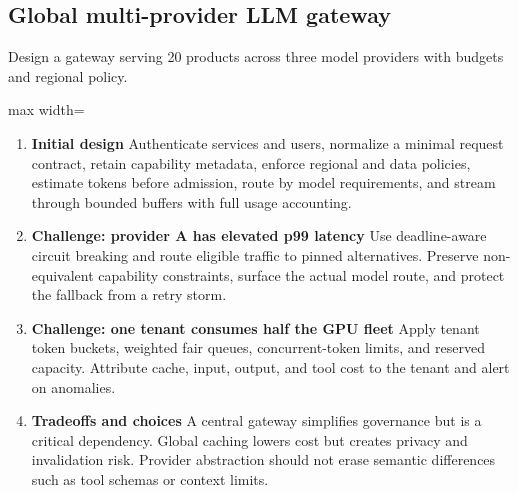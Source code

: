 \subsection{Global multi-provider LLM gateway}
Design a gateway serving 20 products across three model providers with budgets and regional policy.
\begin{center}\begin{adjustbox}{max width=\linewidth}\end{adjustbox}\end{center}
\begin{enumerate}
\item \textbf{Initial design} Authenticate services and users, normalize a minimal request contract, retain capability metadata, enforce regional and data policies, estimate tokens before admission, route by model requirements, and stream through bounded buffers with full usage accounting.
\item \textbf{Challenge: provider A has elevated p99 latency} Use deadline-aware circuit breaking and route eligible traffic to pinned alternatives. Preserve non-equivalent capability constraints, surface the actual model route, and protect the fallback from a retry storm.
\item \textbf{Challenge: one tenant consumes half the GPU fleet} Apply tenant token buckets, weighted fair queues, concurrent-token limits, and reserved capacity. Attribute cache, input, output, and tool cost to the tenant and alert on anomalies.
\item \textbf{Tradeoffs and choices} A central gateway simplifies governance but is a critical dependency. Global caching lowers cost but creates privacy and invalidation risk. Provider abstraction should not erase semantic differences such as tool schemas or context limits.
\end{enumerate}

